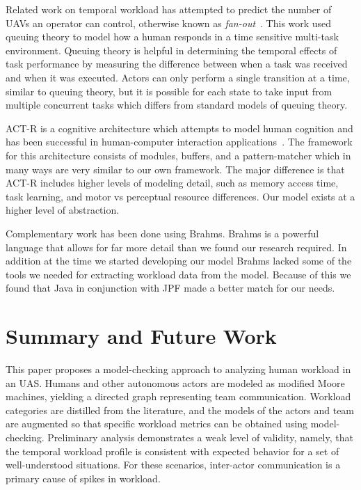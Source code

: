 Related work on temporal workload has attempted to predict the number of UAVs an operator can
control, otherwise known as {\em fan-out}~\cite{cummings2007predicting,OlsenWood2004,CrandallEtAl2005}.  This work used queuing theory
to model how a human responds in a time sensitive multi-task environment.  Queuing theory is helpful in determining the temporal effects of task performance by measuring the difference between when a task was received and when it was executed.  Actors can only perform a single transition at a time, similar to queuing theory, but it is possible for each state to take input from multiple concurrent tasks which differs from standard models of queuing theory.

ACT-R is a cognitive architecture which attempts to model human cognition and
has been successful in human-computer interaction applications~\cite{anderson2004integrated,lebiere2013cognitive}.  The
framework for this architecture consists of modules, buffers, and a pattern-matcher which in many ways are very similar to our own framework.  The major
difference is that ACT-R includes higher levels of modeling detail, such as memory access
time, task learning, and motor vs perceptual resource differences.  Our model exists at a higher level of abstraction.

Complementary work has been done using Brahms.
Brahms is a powerful language that allows for far more detail than we found our research required.
In addition at the time we started developing our model Brahms lacked some of the tools we needed for extracting workload data from the model. Because of this we found that Java in conjunction with JPF made a better match for our needs.

\section{Summary and Future Work}

This paper proposes a model-checking approach to analyzing human workload in an UAS.  Humans and other autonomous actors are modeled as modified Moore machines, yielding a directed graph representing team communication.  Workload categories are distilled from the literature, and the models of the actors and team are augmented so that specific workload metrics can be obtained using model-checking.  Preliminary analysis demonstrates a weak level of validity, namely, that the temporal workload profile is consistent with expected behavior for a set of well-understood situations.  For these scenarios, inter-actor communication is a primary cause of spikes in workload. 

